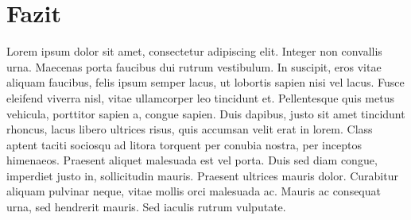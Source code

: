 \section{Fazit}
Lorem ipsum dolor sit amet, consectetur adipiscing elit. Integer non convallis urna. Maecenas porta faucibus dui rutrum vestibulum. In suscipit, eros vitae aliquam faucibus, felis ipsum semper lacus, ut lobortis sapien nisi vel lacus. Fusce eleifend viverra nisl, vitae ullamcorper leo tincidunt et. Pellentesque quis metus vehicula, porttitor sapien a, congue sapien. Duis dapibus, justo sit amet tincidunt rhoncus, lacus libero ultrices risus, quis accumsan velit erat in lorem. Class aptent taciti sociosqu ad litora torquent per conubia nostra, per inceptos himenaeos. Praesent aliquet malesuada est vel porta. Duis sed diam congue, imperdiet justo in, sollicitudin mauris. Praesent ultrices mauris dolor. Curabitur aliquam pulvinar neque, vitae mollis orci malesuada ac. Mauris ac consequat urna, sed hendrerit mauris. Sed iaculis rutrum vulputate. 